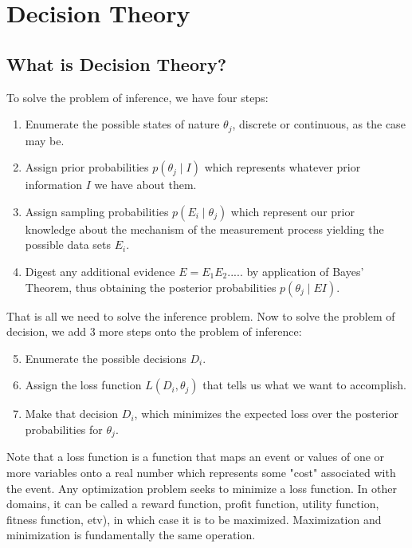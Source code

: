 \documentclass[]{article}
\begin{document}
\section{Decision Theory}

\subsection{What is Decision Theory?}
To solve the problem of inference, we have four steps:

\begin{enumerate}
    \item Enumerate the possible states of nature $\theta_j$, discrete or continuous, as the case may be.
    \item Assign prior probabilities $p(\theta_j\mid I)$ which represents whatever prior information $I$ we have about them. 
    \item Assign sampling probabilities $p(E_i \mid \theta_j)$ which represent our prior knowledge about the mechanism of the measurement process yielding the possible data sets $E_i$.
    \item Digest any additional evidence $E = E_1E_2.....$ by application of Bayes' Theorem, thus obtaining the posterior probabilities $p(\theta_j \mid EI)$. 
\end{enumerate}

\noindent That is all we need to solve the inference problem. Now to solve the problem of decision, we add 3 more steps onto the problem of inference:

\begin{enumerate}
    \setcounter{enumi}{4}
    \item Enumerate the possible decisions $D_i$.
    \item Assign the loss function $L(D_i, \theta_j)$ that tells us what we want to accomplish.
    \item Make that decision $D_i$, which minimizes the expected loss over the posterior probabilities for $\theta_j$.
\end{enumerate}

\noindent Note that a loss function is a function that maps an event or values of one or more variables onto a real number which represents some "cost" associated with the event. Any optimization problem seeks to minimize a loss function. In other domains, it can be called a reward function, profit function, utility function, fitness function, etv), in which case it is to be maximized. Maximization and minimization is fundamentally the same operation. 
\end{document}
